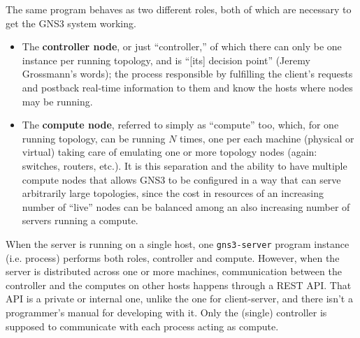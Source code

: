 The same program behaves as two different roles, both of which are necessary to get the GNS3 system working.

\begin{itemize}
	\item The \textbf{controller node}, or just ``controller,'' of which there can only be one instance per running topology, and is ``[its] decision point'' (Jeremy Grossmann's words); the process responsible by fulfilling the client's requests and postback real-time information to them and know the hosts where nodes may be running.
	\item The \textbf{compute node}, referred to simply as ``compute'' too, which, for one running topology, can be running $N$ times, one per each machine (physical or virtual) taking care of emulating one or more topology nodes (again: switches, routers, etc.).
	It is this separation and the ability to have multiple compute nodes that allows GNS3 to be configured in a way that can serve arbitrarily large topologies, since the cost in resources of an increasing number of ``live'' nodes can be balanced among an also increasing number of servers running a compute.
\end{itemize}

When the server is running on a single host, one \texttt{gns3-server} program instance (i.e. process) performs both roles, controller and compute.
However, when the server is distributed across one or more machines, communication between the controller and the computes on other hosts happens through a REST API.
That API is a private or internal one, unlike the one for client-server, and there isn't a programmer's manual for developing with it.
Only the (single) controller is supposed to communicate with each process acting as compute.

